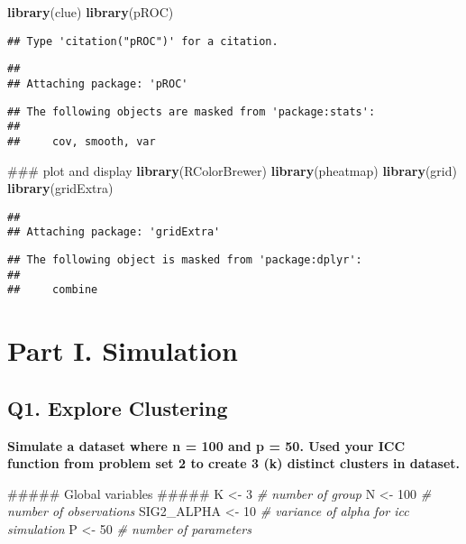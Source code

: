 \documentclass[]{article}
\newenvironment{Shaded}{\begin{snugshade}}{\end{snugshade}}
\newcommand{\KeywordTok}[1]{\textcolor[rgb]{0.13,0.29,0.53}{\textbf{#1}}}
\newcommand{\DecValTok}[1]{\textcolor[rgb]{0.00,0.00,0.81}{#1}}
\newcommand{\StringTok}[1]{\textcolor[rgb]{0.31,0.60,0.02}{#1}}
\newcommand{\CommentTok}[1]{\textcolor[rgb]{0.56,0.35,0.01}{\textit{#1}}}
\newcommand{\NormalTok}[1]{#1}
\begin{document}
\begin{Shaded}
\begin{Highlighting}[]
\KeywordTok{library}\NormalTok{(clue)}
\KeywordTok{library}\NormalTok{(pROC)}
\end{Highlighting}
\end{Shaded}

\begin{verbatim}
## Type 'citation("pROC")' for a citation.
\end{verbatim}

\begin{verbatim}
## 
## Attaching package: 'pROC'
\end{verbatim}

\begin{verbatim}
## The following objects are masked from 'package:stats':
## 
##     cov, smooth, var
\end{verbatim}

\begin{Shaded}
\begin{Highlighting}[]
\NormalTok{### plot and display}
\KeywordTok{library}\NormalTok{(RColorBrewer)}
\KeywordTok{library}\NormalTok{(pheatmap)}
\KeywordTok{library}\NormalTok{(grid)}
\KeywordTok{library}\NormalTok{(gridExtra)}
\end{Highlighting}
\end{Shaded}

\begin{verbatim}
## 
## Attaching package: 'gridExtra'
\end{verbatim}

\begin{verbatim}
## The following object is masked from 'package:dplyr':
## 
##     combine
\end{verbatim}

\section{Part I. Simulation}\label{part-i.-simulation}

\subsection{Q1. Explore Clustering}\label{q1.-explore-clustering}

\textbf{Simulate a dataset where n = 100 and p = 50. Used your ICC
function from problem set 2 to create 3 (k) distinct clusters in
dataset.}

\begin{Shaded}
\begin{Highlighting}[]
\NormalTok{##### Global variables #####}
\NormalTok{K          <-}\StringTok{ }\DecValTok{3}    \CommentTok{# number of group}
\NormalTok{N          <-}\StringTok{ }\DecValTok{100}  \CommentTok{# number of observations}
\NormalTok{SIG2_ALPHA <-}\StringTok{ }\DecValTok{10}   \CommentTok{# variance of alpha for icc simulation}
\NormalTok{P          <-}\StringTok{ }\DecValTok{50}   \CommentTok{# number of parameters}
\end{Highlighting}
\end{Shaded}
\end{document}
